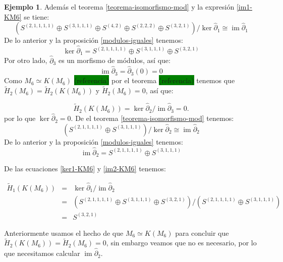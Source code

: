 \documentclass[12pt]{book}
\theoremstyle{definition}
\newtheorem{example}[theorem]{Ejemplo}
\DeclareMathOperator{\im}{im}
\newcounter{in}
\begin{document}
\begin{example}
Además el teorema \ref{teorema-isomorfismo-mod} y la expresión \ref{im1-KM6} se tiene:
$$(S^{(2,1,1,1,1)}\oplus S^{(3,1,1,1)}\oplus S^{(4,2)}\oplus
      S^{(2,2,2)}\oplus S^{(3,2,1)})/\ker \widehat\partial_{1}\cong \im \widehat\partial_{1}$$
De lo anterior y la proposición \ref{modulos-iguales} tenemos:
\begin{equation}
\label{ker1-KM6}
\ker \widehat\partial_{1}=S^{(2,1,1,1,1)}\oplus S^{(3,1,1,1)}\oplus S^{(3,2,1)}
\end{equation}
Por otro lado, $\widehat\partial_{3}$ es un morfismo de módulos, así que:
\begin{equation*}
\im\widehat\partial_{3}=\widehat\partial_{3}(0)=0
\label{im3-KM6}
\end{equation*}
Como $M_{6}\simeq K(M_{6})$
\setlength{\fboxsep}{0pt}\colorbox{green}{(referencia)} por el teorema
\setlength{\fboxsep}{0pt}\colorbox{green}{(referencia)} tenemos que
$\widetilde H_{2}(M_{6})=\widetilde H_{2}(K(M_{6}))$ y  $\widetilde
H_{2}(M_{6})=0$, así que:

\begin{equation*}
\widetilde H_{2}(K(M_{6}))=\ker \widehat\partial_{2}/\im \widehat\partial_{3}=0.
\end{equation*}
por lo que $\ker \widehat\partial_{2}=0$. De el teorema
\ref{teorema-isomorfismo-mod} tenemos:
$$(S^{(2,1,1,1,1)}\oplus S^{(3,1,1,1)})/\ker \widehat\partial_{2}\cong \im
\widehat\partial_{2}$$
De lo anterior y la proposición \ref{modulos-iguales} tenemos:
\begin{equation}
\im \widehat\partial_{2}=S^{(2,1,1,1,1)}\oplus S^{(3,1,1,1)}
\label{im2-KM6}
\end{equation}

De las ecuaciones \ref{ker1-KM6} y \ref{im2-KM6} tenemos:

\begin{eqnarray*}
  \widetilde H_{1}(K(M_{6}))&=&\ker \widehat\partial_{1}/\im
  \widehat\partial_{2}\\
  &=&(S^{(2,1,1,1,1)}\oplus S^{(3,1,1,1)}\oplus
  S^{(3,2,1)})/(S^{(2,1,1,1,1)}\oplus S^{(3,1,1,1)})\\
  &=&S^{(3,2,1)}
\end{eqnarray*}




Anteriormente usamos el hecho de que $M_{6}\simeq K(M_{6})$  para
concluir que $\widetilde H_{2}(K(M_{6}))=\widetilde H_{2}(M_{6})=0$, sin embargo veamos que no es necesario, por lo que
necesitamos calcular $\im \widehat\partial_{2}$. 


\end{example}
\end{document}
